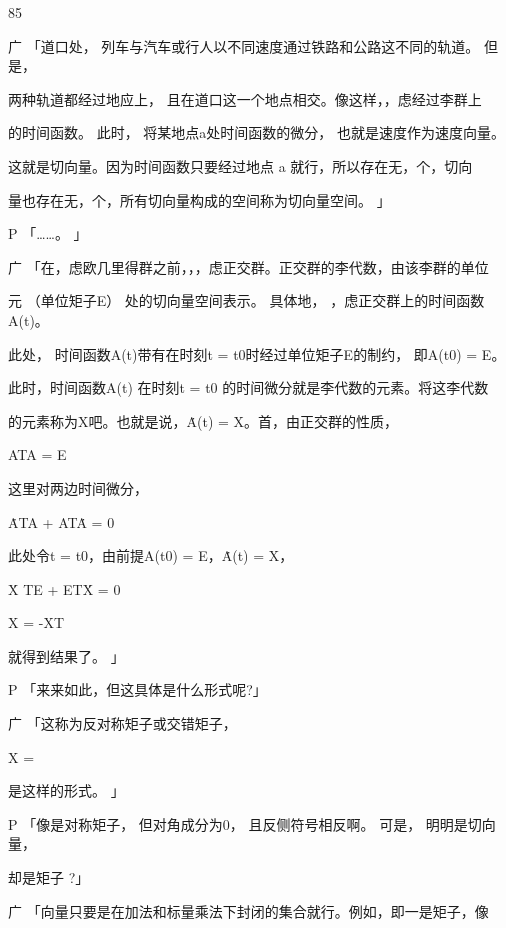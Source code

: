 85\par
广 「道口处， 列车与汽车或行人以不同速度通过铁路和公路这不同的轨道。 但是，\par
两种轨道都经过地应上， 且在道口这一个地点相交。像这样，，虑经过李群上\par
的时间函数。 此时， 将某地点a处时间函数的微分， 也就是速度作为速度向量。\par
这就是切向量。因为时间函数只要经过地点 a 就行，所以存在无，个，切向\par
量也存在无，个，所有切向量构成的空间称为切向量空间。 」\par
P 「……。 」\par
广 「在，虑欧几里得群之前，，，虑正交群。正交群的李代数，由该李群的单位\par
元 （单位矩子E） 处的切向量空间表示。 具体地， ，虑正交群上的时间函数A(t)。\par
此处， 时间函数A(t)带有在时刻t = t0时经过单位矩子E的制约， 即A(t0) = E。\par
此时，时间函数A(t) 在时刻t = t0 的时间微分就是李代数的元素。将这李代数\par
的元素称为X吧。也就是说，Ȧ(t) = X。首，由正交群的性质，\par
ATA = E\par
这里对两边时间微分，\par
ȦTA + ATȦ = 0\par
此处令t = t0，由前提A(t0) = E，Ȧ(t) = X，\par
Ẋ TE + ETẊ = 0\par
X = -XT\par
就得到结果了。 」\par
P 「来来如此，但这具体是什么形式呢?」\par
广 「这称为反对称矩子或交错矩子，\par
X =\par
[\par
0 x12 x13 $\cdots$ x1n\par
-x12 0 x23 $\cdots$ x2n\par
-x13 -x23 0 $\cdots$ x3n\par
$\vdots$ $\vdots$ $\vdots$ $\ddots$ $\vdots$\par
-x1n -x2n -x3n $\cdots$ 0 ]\par
是这样的形式。 」\par
P 「像是对称矩子， 但对角成分为0， 且反侧符号相反啊。 可是， 明明是切向量，\par
却是矩子 ?」\par
广 「向量只要是在加法和标量乘法下封闭的集合就行。例如，即一是矩子，像\par

